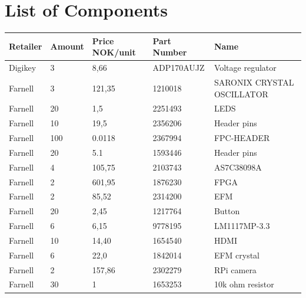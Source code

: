 \chapter{List of Components}
\label{app:components}
\begin{table}[h]
    \centering
    \begin{tabular}{lllll}
        Retailer    & Amount & Price NOK/unit & Part Number            & Name                        \\
        \hline
        Digikey     & 3      & 8,66          & ADP170AUJZ & Voltage regulator           \\
        Farnell     & 3      & 121,35        & 1210018                & SARONIX  CRYSTAL OSCILLATOR \\
        Farnell     & 20     & 1,5           & 2251493                & LEDS                        \\
        Farnell     & 10     & 19,5          & 2356206                & Header pins                 \\
        Farnell     & 100    & 0.0118        & 2367994                & FPC-HEADER                  \\
        Farnell     & 20     & 5.1           & 1593446                & Header pins                 \\
        Farnell     & 4      & 105,75        & 2103743                & AS7C38098A                  \\
        Farnell     & 2      & 601,95        & 1876230                & FPGA                        \\
        Farnell     & 2      & 85,52         & 2314200                & EFM                         \\
        Farnell     & 20     & 2,45          & 1217764                & Button                      \\
        Farnell     & 6      & 6,15          & 9778195                & LM1117MP-3.3                \\
        Farnell     & 10     & 14,40         & 1654540                & HDMI                        \\
        Farnell     & 6      & 22,0          & 1842014                & EFM crystal                 \\
        Farnell     & 2      & 157,86        & 2302279                & RPi camera                  \\
        Farnell     & 30     & 1             & 1653253                & 10k ohm resistor            \\

\end{tabular}
\end{table}
